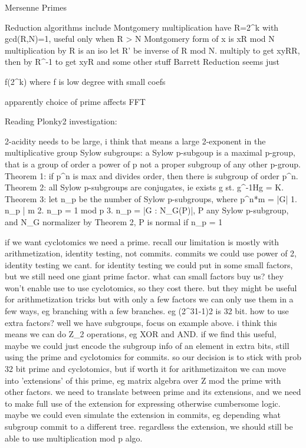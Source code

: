 
Mersenne Primes

Reduction algorithms include
Montgomery multiplication
    have R=2^k with gcd(R,N)=1, useful only when R > N
    Montgomery form of x is xR mod N
    multiplication by R is an iso
    let R' be inverse of R mod N.
    multiply to get xyRR, then by R^{-1} to get xyR
    and some other stuff
Barrett Reduction
    seems just 


f(2^k) where f is low degree with small coefs



apparently choice of prime affects FFT


Reading Plonky2 investigation:

2-acidity needs to be large, i think that means a large 2-exponent in the multiplicative group
Sylow subgroups:
    a Sylow p-subgoup is a maximal p-group, that is a group of order a power of p not a proper subgroup of any other p-group.
Theorem 1: if p^n is max and divides order, then there is subgroup of order p^n.
Theorem 2: all Sylow p-subgroups are conjugates, ie exists g st. g^{-1}Hg = K.
Theorem 3: let n_p be the number of Sylow p-subgroups, where p^n*m = |G|
    1. n_p | m
    2. n_p = 1 mod p
    3. n_p = |G : N_G(P)|, P any Sylow p-subgroup, and N_G normalizer
by Theorem 2, P is normal if n_p = 1


if we want cyclotomics we need a prime. recall our limitation is mostly with arithmetization, identity testing, not commits. commits we could use power of 2, identity testing we cant. 
for identity testing we could put in some small factors, but we still need one giant prime factor.
what can small factors buy us? they won't enable use to use cyclotomics, so they cost there. but they might be useful for arithmetization tricks but with only a few factors we can only use them in a few ways, eg branching with a few branches.
eg (2^31-1)2 is 32 bit. 
how to use extra factors? well we have subgroups, focus on example above. i think this means we can do Z_2 operations, eg XOR and AND.
if we find this useful, maybe we could just encode the subgroup info of an element in extra bits, still using the prime and cyclotomics for commits. 
so our decision is to stick with prob 32 bit prime and cyclotomics, but if worth it for arithmetizaiton we can move into 'extensions' of this prime, eg matrix algebra over Z mod the prime with other factors. we need to translate between prime and its extensions, and we need to make full use of the extension for expressing otherwise cumbersome logic.
maybe we could even simulate the extension in commits, eg depending what subgroup commit to a different tree.
regardless the extension, we should still be able to use multiplication mod p algo.




